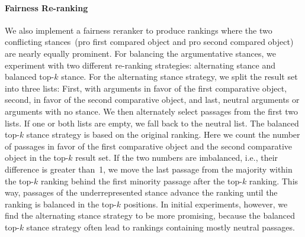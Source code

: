 \paragraph{Fairness Re-ranking}

We also implement a fairness reranker to produce rankings where the two conflicting stances~(pro first compared object and pro second compared object) are nearly equally prominent.
For balancing the argumentative stances, we experiment with two different re-ranking strategies: \Ni alternating stance and \Nii balanced top-\(k\) stance.
For the alternating stance strategy, we split the result set into three lists: First, with arguments in favor of the first comparative object, second, in favor of the second comparative object, and last, neutral arguments or arguments with no stance.
We then alternately select passages from the first two lists. If one or both lists are empty, we fall back to the neutral list.
The balanced top-\(k\) stance strategy is based on the original ranking.
Here we count the number of passages in favor of the first comparative object and the second comparative object in the top-\(k\) result set.
If the two numbers are imbalanced, i.e., their difference is greater than~1, we move the last passage from the majority within the top-\(k\) ranking behind the first minority passage after the top-\(k\) ranking.
This way, passages of the underrepresented stance advance the ranking until the ranking is balanced in the top-\(k\) positions.
In initial experiments, however, we find the alternating stance strategy to be more promising, because the balanced top-\(k\) stance strategy often lead to rankings containing mostly neutral passages.
